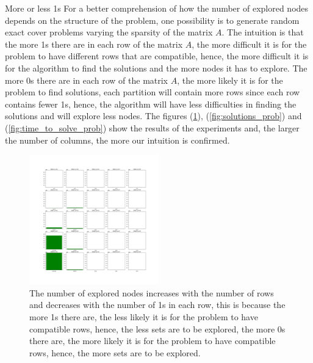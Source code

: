 \documentclass{beamer}
\begin{document}
\begin{frame}{More or less 1s}
    For a better comprehension of how the number of explored nodes 
    depends on the structure of the problem, one possibility
    is to generate random exact cover problems varying the sparsity
    of the matrix $A$.
    The intuition is that the more 1s there are in each row
    of the matrix $A$, the more difficult it is for the problem
    to have different rows that are compatible,
    hence, the more difficult it is for the algorithm to find
    the solutions and the more nodes it has to explore.
    The more 0s there are in each row of the matrix $A$, the more
    likely it is for the problem to find solutions,
    each partition will contain more rows since each row contains
    fewer 1s, hence, the algorithm will have less difficulties
    in finding the solutions and will explore less nodes.
    The figures (\ref{fig:explored_nodes_prob}), (\ref{fig:solutions_prob})
    and (\ref{fig:time_to_solve_prob}) show the results of the experiments
    and, the larger the number of columns,
    the more our intuition is confirmed.
\end{frame}

\begin{frame}{}
    \begin{figure}
        \centering
        \includegraphics[width=0.5\textwidth]{explored_nodes_prob.pdf}
        \caption{The number of explored nodes increases with the number of rows and 
        decreases with the number of 1s in each row, this is because the more 1s there are,
        the less likely it is for the problem to have compatible rows, hence, the less sets 
        are to be explored, the more 0s there are, the more likely it is for the problem
        to have compatible rows, hence, the more sets are to be explored.}
        \label{fig:explored_nodes_prob}
    \end{figure}
\end{frame}
\end{document}
